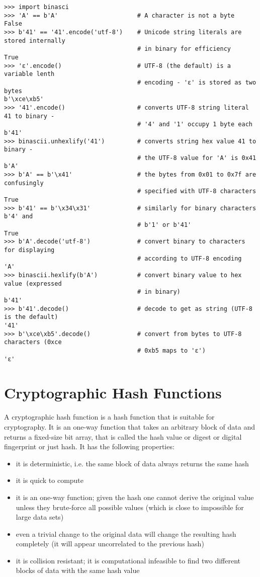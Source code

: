 \vspace{1em}
\begin{lstlisting}[style=Python,label={lst:encodings-3},caption={Python examples},captionpos=b]
>>> import binasci
>>> 'A' == b'A'                      # A character is not a byte
False
>>> b'41' == '41'.encode('utf-8')    # Unicode string literals are stored internally
                                     # in binary for efficiency
True
>>> 'ε'.encode()                     # UTF-8 (the default) is a variable lenth
                                     # encoding - 'ε' is stored as two bytes
b'\xce\xb5'
>>> '41'.encode()                    # converts UTF-8 string literal 41 to binary -
                                     # '4' and '1' occupy 1 byte each
b'41'
>>> binascii.unhexlify('41')         # converts string hex value 41 to binary - 
                                     # the UTF-8 value for 'A' is 0x41
b'A'
>>> b'A' == b'\x41'                  # the bytes from 0x01 to 0x7f are confusingly
                                     # specified with UTF-8 characters
True
>>> b'41' == b'\x34\x31'             # similarly for binary characters b'4' and
                                     # b'1' or b'41'
True
>>> b'A'.decode('utf-8')             # convert binary to characters for displaying
                                     # according to UTF-8 encoding
'A'
>>> binascii.hexlify(b'A')           # convert binary value to hex value (expressed
                                     # in binary)
b'41'
>>> b'41'.decode()                   # decode to get as string (UTF-8 is the default)
'41'
>>> b'\xce\xb5'.decode()             # convert from bytes to UTF-8 characters (0xce
                                     # 0xb5 maps to 'ε')
'ε'
\end{lstlisting}
\vspace{1em}


\section{Cryptographic Hash Functions}
A cryptographic hash function is a hash function that is suitable for cryptography. It is an one-way function that takes an arbitrary block of data and returns a fixed-size bit array, that is called the hash value or digest or digital fingerprint or just hash. It has the following properties:

\begin{itemize}
\item it is deterministic, i.e. the same block of data always returns the same hash
\item it is quick to compute
\item it is an one-way function; given the hash one cannot derive the original value unless they brute-force all possible values (which is close to impossible for large data sets)
\item even a trivial change to the original data will change the resulting hash completely (it will appear uncorrelated to the previous hash)
\item it is collision resistant; it is computational infeasible to find two different blocks of data with the same hash value
\end{itemize}

